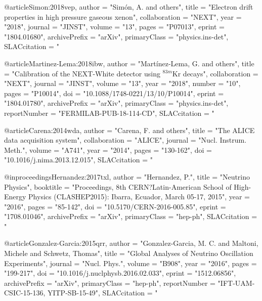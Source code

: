 {{{@article{Simon:2018vep,
      author         = "Sim\'on, A. and others",
      title          = "{Electron drift properties in high pressure gaseous
                        xenon}",
      collaboration  = "NEXT",
      year           = "2018",
      journal        = "JINST",
      volume         = "13",
      pages          = "P07013",
      eprint         = "1804.01680",
      archivePrefix  = "arXiv",
      primaryClass   = "physics.ins-det",
      SLACcitation   = "%
}

@article{Martinez-Lema:2018ibw,
      author         = "Mart\'inez-Lema, G. and others",
      title          = "{Calibration of the NEXT-White detector using
                        $^{83m}\mathrm{Kr}$ decays}",
      collaboration  = "NEXT",
      journal        = "JINST",
      volume         = "13",
      year           = "2018",
      number         = "10",
      pages          = "P10014",
      doi            = "10.1088/1748-0221/13/10/P10014",
      eprint         = "1804.01780",
      archivePrefix  = "arXiv",
      primaryClass   = "physics.ins-det",
      reportNumber   = "FERMILAB-PUB-18-114-CD",
      SLACcitation   = "%
}


@article{Carena:2014wda,
      author         = "Carena, F. and others",
      title          = "{The ALICE data acquisition system}",
      collaboration  = "ALICE",
      journal        = "Nucl. Instrum. Meth.",
      volume         = "A741",
      year           = "2014",
      pages          = "130-162",
      doi            = "10.1016/j.nima.2013.12.015",
      SLACcitation   = "%
}

@inproceedings{Hernandez:2017txl,
      author         = "Hernandez, P.",
      title          = "{Neutrino Physics}",
      booktitle      = "{Proceedings, 8th CERN?Latin-American School of
                        High-Energy Physics (CLASHEP2015): Ibarra, Ecuador, March
                        05-17, 2015}",
      year           = "2016",
      pages          = "85-142",
      doi            = "10.5170/CERN-2016-005.85",
      eprint         = "1708.01046",
      archivePrefix  = "arXiv",
      primaryClass   = "hep-ph",
      SLACcitation   = "%
}

@article{Gonzalez-Garcia:2015qrr,
      author         = "Gonzalez-Garcia, M. C. and Maltoni, Michele and Schwetz,
                        Thomas",
      title          = "{Global Analyses of Neutrino Oscillation Experiments}",
      journal        = "Nucl. Phys.",
      volume         = "B908",
      year           = "2016",
      pages          = "199-217",
      doi            = "10.1016/j.nuclphysb.2016.02.033",
      eprint         = "1512.06856",
      archivePrefix  = "arXiv",
      primaryClass   = "hep-ph",
      reportNumber   = "IFT-UAM-CSIC-15-136, YITP-SB-15-49",
      SLACcitation   = "%
}

}}}
